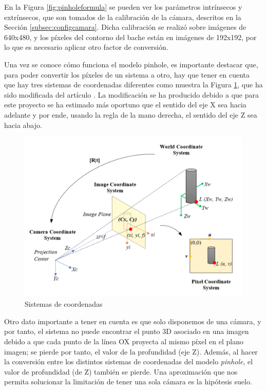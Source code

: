 En la Figura \ref{fig:pinholeformula} se pueden ver los parámetros intrínsecos y extrínsecos, que son tomados de la calibración de la cámara, descritos en la Sección \ref{subsec:configcamara}. Dicha calibración se realizó sobre imágenes de 640x480, y los píxeles del contorno del bache están en imágenes de 192x192, por lo que es necesario aplicar otro factor de conversión. 

Una vez se conoce cómo funciona el modelo pinhole, es importante destacar que, para poder convertir los píxeles de un sistema a otro, hay que tener en cuenta que hay tres sistemas de coordenadas diferentes como muestra la Figura \ref{fig:siscoordenadas}, que ha sido modificada del artículo \cite{unknown}. La modificación se ha producido debido a que para este proyecto se ha estimado más oportuno que el sentido del eje X sea hacia adelante y por ende, usando la regla de la mano derecha, el sentido del eje Z sea hacia abajo.

 \begin{figure} [h!]
	\begin{center}
		\includegraphics[width=15cm]{figs/cap6/pinholecoordinates.png}
	\end{center}
	\caption{Sistemas de coordenadas}
	\label{fig:siscoordenadas}
\end{figure}

Otro dato importante a tener en cuenta es que solo disponemos de una cámara, y por tanto, el sistema no puede encontrar el punto 3D asociado en una imagen debido a que cada punto de la línea OX proyecta al mismo píxel en el plano imagen; se pierde por tanto, el valor de la profundidad (eje Z). Además, al hacer la conversión entre los distintos sistemas de coordenadas del modelo \textit{pinhole}, el valor de profundidad (de Z) también se pierde. Una aproximación que nos permita solucionar la limitación de tener una sola cámara es la hipótesis suelo. 

